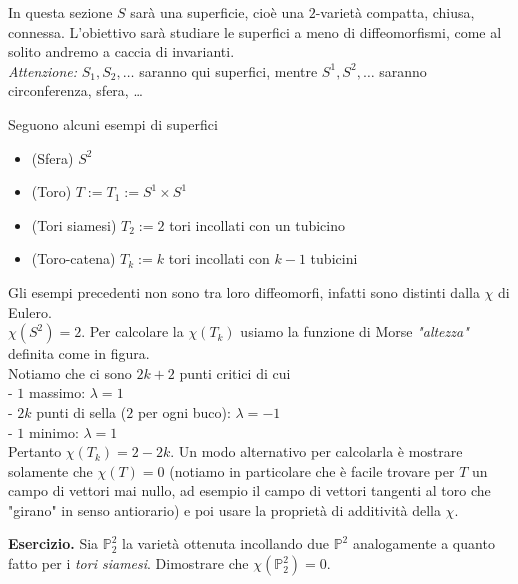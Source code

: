 

In questa sezione $S$ sarà una superficie, cioè una $2$-varietà compatta, chiusa, connessa. L'obiettivo sarà studiare le superfici a meno di diffeomorfismi, come al solito andremo a caccia di invarianti.\\
\emph{Attenzione:} $S_1, S_2, \dots$ saranno qui superfici, mentre $S^1, S^2, \dots$ saranno circonferenza, sfera, \dots

\begin{es} Seguono alcuni esempi di superfici
\begin{itemize}
\item (Sfera) $S^2$
\item (Toro) $T := T_1 := S^1 \times S^1$
\item (Tori siamesi) $T_2 := 2$ tori incollati con un tubicino
\item (Toro-catena) $T_k := k$ tori incollati con $k-1$ tubicini
\end{itemize}
\end{es}

\begin{oss}
Gli esempi precedenti non sono tra loro diffeomorfi, infatti sono distinti dalla $\chi$ di Eulero. \\
$\chi(S^2) = 2$. Per calcolare la $\chi(T_k)$ usiamo la funzione di Morse \emph{"altezza"} definita come in figura.  \\ Notiamo che ci sono $2k + 2$ punti critici di cui\\
- $1$ massimo: $\lambda = 1$ \\
- $2k$ punti di sella ($2$ per ogni buco): $\lambda = -1$ \\
- $1$ minimo: $\lambda = 1$ \\
Pertanto $\chi(T_k) = 2 - 2k$. Un modo alternativo per calcolarla è mostrare solamente che $\chi(T) = 0$ (notiamo in particolare che è facile trovare per $T$ un campo di vettori mai nullo, ad esempio il campo di vettori tangenti al toro che "girano" in senso antiorario) e poi usare la proprietà di additività della $\chi$.
\end{oss}

\noindent \textbf{Esercizio.}  Sia $\mathbb{P}_2^2$ la varietà ottenuta incollando due $\mathbb{P}^2$ analogamente a quanto fatto per i \emph{tori siamesi}. Dimostrare che $\chi(\mathbb{P}_2^2) = 0$.

